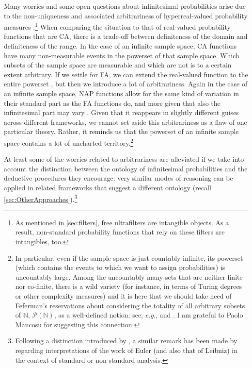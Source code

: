 Many worries and some open questions about infinitesimal probabilities arise due to the non-uniqueness and associated arbitrariness of hyperreal-valued probability measures \citep[also discussed, \textit{e.g.}, by][]{Hofweber:2014}.\footnote{As mentioned in \autoref{sec:filters}, free ultrafilters are intangible objects. As a result, non-standard probability functions that rely on these filters are intangibles, too.} When comparing the situation to that of real-valued probability functions that are CA, there is a trade-off between definiteness of the domain and definiteness of the range. In the case of an infinite sample space, CA functions have many non-measurable events in the powerset of that sample space. Which subsets of the sample space are measurable and which are not is to a certain extent arbitrary. If we settle for FA, we can extend the real-valued function to the entire powerset \citep[by considering Banach limits; see for instance][]{SchurzLeitgeb:2008}, but then we introduce a lot of arbitrariness. Again in the case of an infinite sample space, NAP functions allow for the same kind of variation in their standard part as the FA functions do, and more given that also the infinitesimal part may vary \citep[see for instance][]{Kremer:2014}. Given that it reappears in slightly different guises across different frameworks, we cannot set aside this arbitrariness as a flaw of one particular theory. Rather, it reminds us that the powerset of an infinite sample space contains a lot of uncharted territory.\footnote{In particular, even if the sample space is just countably infinite, its powerset (which contains the events to which we want to assign probabilities) is uncountably large. Among the uncountably many sets that are neither finite nor co-finite, there is a wild variety (for instance, in terms of Turing degrees or other complexity measures) and it is here that we should take heed of Feferman's reservations about considering the totality of all arbitrary subsets of $\mathbb{N}$, $\mathcal{P}(\mathbb{N})$, as a well-defined notion; see, \textit{e.g.}, \citet[p.~166]{Feferman:1979} and \citet{Feferman:1999}. I am grateful to Paolo Mancosu for suggesting this connection.}

At least some of the worries related to arbitrariness are alleviated if we take into account the distinction between the ontology of infinitesimal probabilities and the deductive procedures they encourage: very similar modes of reasoning can be applied in related frameworks that suggest a different ontology (recall \autoref{sec:OtherApproaches}).\footnote{Following a distinction introduced by \citet{Benacerraf:1965}, a similar remark has been made by \citet[section~2.3]{Katz:201x} regarding interpretations of the work of Euler (and also that of Leibniz) in the context of standard or non-standard analysis.}

